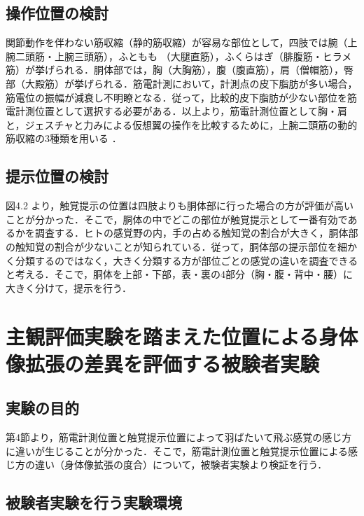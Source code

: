 \begin{small}
    \subsection{操作位置の検討} %
      関節動作を伴わない筋収縮（静的筋収縮）が容易な部位として，四肢では腕（上腕二頭筋・上腕三頭筋），ふともも
      （大腿直筋），ふくらはぎ（腓腹筋・ヒラメ筋）が挙げられる．胴体部では，胸（大胸筋），腹（腹直筋），肩（僧帽筋），臀部（大殿筋）が挙げられる．筋電計測において，計測点の皮下脂肪が多い場合，筋電位の振幅が減衰し不明瞭となる\cite{白石恵1992筋電位多点計測による体幹背部の神経支配帯の分布}．従って，比較的皮下脂肪が少ない部位を筋電計測位置として選択する必要がある．以上より，筋電計測位置として胸・肩と，ジェスチャと力みによる仮想翼の操作を比較するために，上腕二頭筋の動的筋収縮の3種類を用いる
      ．

    \subsection{提示位置の検討} %
      図4.2
      より，触覚提示の位置は四肢よりも胴体部に行った場合の方が評価が高いことが分かった．そこで，胴体の中でどこの部位が触覚提示として一番有効であるかを調査する．ヒトの感覚野の内，手の占める触知覚の割合が大きく\cite{penfield1950cerebral}，胴体部の触知覚の割合が少ない\cite{gibson1962observations}ことが知られている．従って，胴体部の提示部位を細かく分類するのではなく，大きく分類する方が部位ごとの感覚の違いを調査できると考える．そこで，胴体を上部・下部，表・裏の4部分（胸・腹・背中・腰）に大きく分けて，提示を行う．        

      


\section{主観評価実験を踏まえた位置による身体像拡張の差異を評価する被験者実験}
        
  \subsection{実験の目的}
        第4節より，筋電計測位置と触覚提示位置によって羽ばたいて飛ぶ感覚の感じ方に違いが生じることが分かった．そこで，筋電計測位置と触覚提示位置による感じ方の違い（身体像拡張の度合）について，被験者実験より検証を行う．

  \subsection{被験者実験を行う実験環境}


\end{small}

